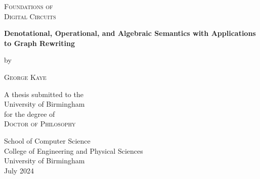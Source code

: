 \begin{titlepage}
  \begin{center}

    \large %

    {\Huge\textsc{Foundations of\\Digital Circuits}\par}


    {\Large\textbf{
        Denotational, Operational, and Algebraic Semantics
        with Applications to Graph Rewriting
      }}


    by


    {\huge\textsc{George Kaye}}


    A thesis submitted to the \\
    University of Birmingham \\
    for the degree of \\
    \textsc{Doctor of Philosophy}

    \vfill

    \flushright
    School of Computer Science \\
    College of Engineering and Physical Sciences \\
    University of Birmingham \\
    July 2024

  \end{center}
\end{titlepage}